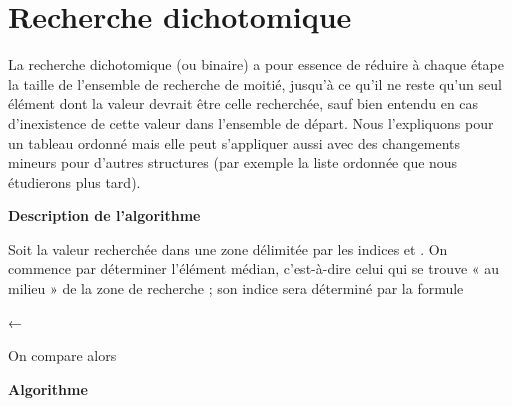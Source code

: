 	\section{Recherche dichotomique}

		La recherche dichotomique (ou binaire) a pour essence de réduire à
		chaque étape la taille de l’ensemble de recherche de moitié, jusqu’à ce
		qu’il ne reste qu’un seul élément dont la valeur devrait être celle
		recherchée, sauf bien entendu en cas d’inexistence de cette valeur dans
		l’ensemble de départ. Nous l’expliquons pour un tableau ordonné mais
		elle peut s’appliquer aussi avec des changements mineurs pour
		d'autres structures (par exemple la liste ordonnée que
		nous étudierons plus tard).

		{\sffamily\bfseries\upshape
		Description de l’algorithme}

		Soit  la valeur recherchée dans une zone
		délimitée par les indices  et
		. On commence par déterminer l’élément
		médian, c’est-à-dire celui qui se trouve « au milieu » de la zone de
		recherche ; son indice sera déterminé par la formule

		{\centering
		\textsf{←}{
		}
		\par}

		On compare alors 

		{\sffamily\bfseries
		Algorithme}
		
